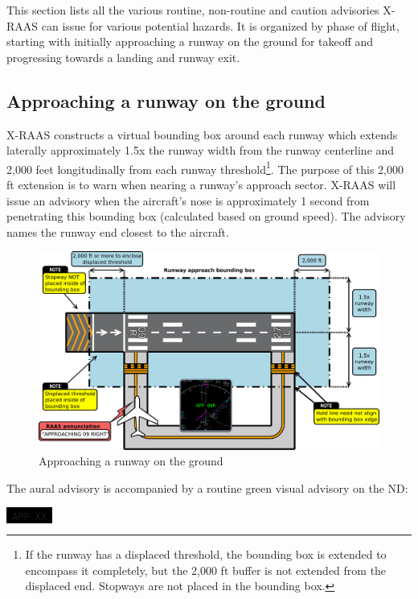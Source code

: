 \documentclass[a4paper,12pt]{article}
\newcommand{\visualadvisory}[3][b]{%
    \ifthenelse{\equal{#1}{b}}{\begin{center}}{}
    \noindent
    \colorbox{black}{\textcolor{#2visualadvisorycolor}{\large\texttt{~#3~}}}
    \ifthenelse{\equal{#1}{b}}{\end{center}}{}}
\begin{document}
This section lists all the various routine, non-routine and caution
advisories X-RAAS can issue for various potential hazards. It is
organized by phase of flight, starting with initially approaching a
runway on the ground for takeoff and progressing towards a landing and
runway exit.

\subsection{Approaching a runway on the ground}
\label{subsec:ApchGndMon}

X-RAAS constructs a virtual bounding box around each runway which extends
laterally approximately 1.5x the runway width from the runway centerline
and 2,000 feet longitudinally from each runway threshold\footnote{If the
runway has a displaced threshold, the bounding box is extended to
encompass it completely, but the 2,000 ft buffer is not extended from the
displaced end. Stopways are not placed in the bounding box.}. The purpose
of this 2,000 ft extension is to warn when nearing a runway's approach
sector. X-RAAS will issue an advisory when the aircraft's nose is
approximately 1 second from penetrating this bounding box (calculated
based on ground speed). The advisory names the runway end closest to the
aircraft.

\begin{figure}[H]
\begin{center}
\includegraphics[width=\textwidth]{../src/apch.pdf}
\end{center}
\caption{Approaching a runway on the ground}
\end{figure}

\noindent The aural advisory is accompanied by a routine green visual
advisory on the ND:

\visualadvisory{routine}{APP XX}
\end{document}
